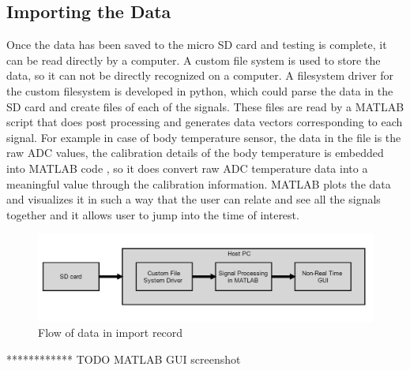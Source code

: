 \subsection{Importing the Data}
Once the data has been saved to the micro SD card and testing is complete, it can be read directly by a computer. A custom file system is used to store the data, so it can not be directly recognized on a computer. A filesystem driver for the custom filesystem is developed in python, which could parse the data in the SD card and create files of each of the signals. These files are read by a MATLAB script that does post processing and generates data vectors corresponding to each signal. For example in case of body temperature sensor, the data in the file is the raw ADC values, the calibration details of the body temperature is embedded into MATLAB code , so it does convert raw ADC temperature  data into a meaningful value through the calibration information.  
MATLAB plots the data and visualizes it in such a way that the user can relate and see all the signals together and it allows user to jump into the time of interest. 
 \begin{figure}[h]
	\centering
	\includegraphics[scale = 0.5 ]{play_dataflow.JPG}
	\caption{Flow of data in import record\label{play_dataflow}}
\end{figure}

************
TODO MATLAB GUI screenshot
